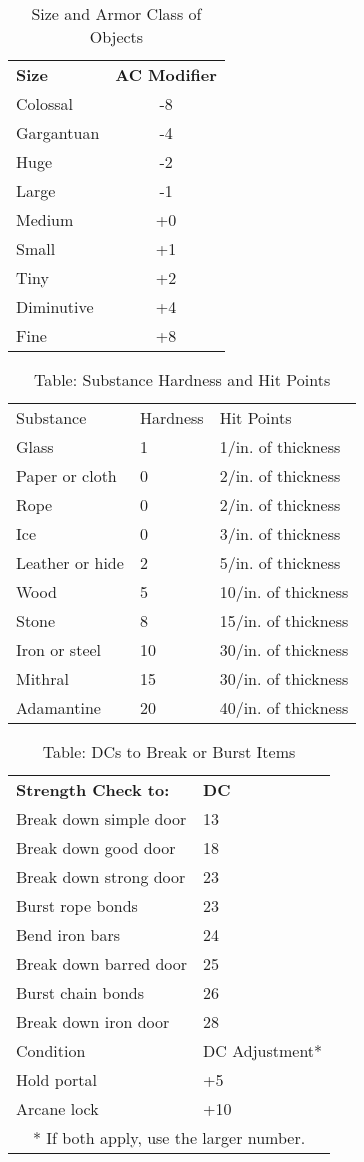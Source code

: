 \begin{table}[htb]
\sffamily
{}
\caption{Size and Armor Class of Objects}
\centering
\begin{tabular}{l c}
\textbf{Size} & \textbf{AC Modifier}\\
Colossal & -8\\
Gargantuan & -4\\
Huge & -2\\
Large & -1\\
Medium & +0\\
Small & +1\\
Tiny & +2\\
Diminutive & +4\\
Fine & +8\\
\end{tabular}
\end{table}


\begin{table}[]
\sffamily
\caption{Table: Substance Hardness and Hit Points}
\begin{tabular}{lll}
Substance & Hardness & Hit Points\\
Glass & 1 & 1/in. of thickness\\
Paper or cloth & 0 & 2/in. of thickness\\
Rope & 0 & 2/in. of thickness\\
Ice & 0 & 3/in. of thickness\\
Leather or hide & 2 & 5/in. of thickness\\
Wood & 5 & 10/in. of thickness\\
Stone & 8 & 15/in. of thickness\\
Iron or steel & 10 & 30/in. of thickness\\
Mithral & 15 & 30/in. of thickness\\
Adamantine & 20 & 40/in. of thickness\\
\end{tabular}
\end{table}
\begin{table}[]
\sffamily
\caption{Table: DCs to Break or Burst Items}
\begin{tabular}{ll}
\textbf{Strength Check to:} & \textbf{DC}\\
Break down simple door & 13\\
Break down good door & 18\\
Break down strong door & 23\\
Burst rope bonds & 23\\
Bend iron bars & 24\\
Break down barred door & 25\\
Burst chain bonds & 26\\
Break down iron door & 28\\
Condition & DC Adjustment*\\
Hold portal & +5\\
Arcane lock & +10\\
\multicolumn{2}{c}{* If both apply, use the larger number.}\\
\end{tabular}
\end{table}
		
